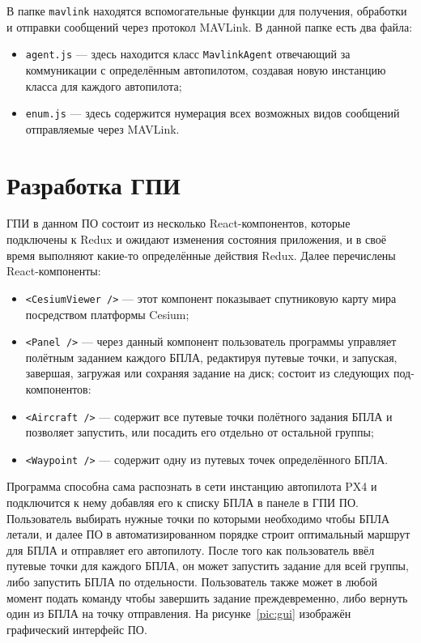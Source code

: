 \documentclass[specification,annotation]{itmo-student-thesis}
\begin{document}
В папке \verb|mavlink| находятся вспомогательные функции для получения,
обработки и отправки сообщений через протокол MAVLink. В данной папке есть два
файла:

\begin{itemize}
  \item \verb|agent.js| --- здесь находится класс \verb|MavlinkAgent| отвечающий
    за коммуникации с определённым автопилотом, создавая новую инстанцию класса
    для каждого автопилота;
  \item \verb|enum.js| --- здесь содержится нумерация всех возможных видов
    сообщений отправляемые через MAVLink.
\end{itemize}

\section{Разработка ГПИ}\label{sec:devgui}

ГПИ в данном ПО состоит из несколько React-компонентов, которые подключены к
Redux и ожидают изменения состояния приложения, и в своё время выполняют
какие-то определённые действия Redux. Далее перечислены React-компоненты:

\begin{itemize}
  \item \verb|<CesiumViewer />| --- этот компонент показывает спутниковую карту
    мира посредством платформы Cesium;
  \item \verb|<Panel />| --- через данный компонент пользователь программы
    управляет полётным заданием каждого БПЛА, редактируя путевые точки, и
    запуская, завершая, загружая или сохраняя задание на диск; состоит из
    следующих под-компонентов:
    \item \verb|<Aircraft />| --- содержит все путевые точки полётного задания
      БПЛА и позволяет запустить, или посадить его отдельно от остальной группы;
    \item \verb|<Waypoint />| --- содержит одну из путевых точек определённого
      БПЛА.
\end{itemize}

Программа способна сама распознать в сети инстанцию автопилота PX4 и
подключится к нему добавляя его к списку БПЛА в панеле в ГПИ ПО. Пользователь
выбирать нужные точки по которыми необходимо чтобы БПЛА летали, и далее ПО
в автоматизированном порядке строит оптимальный маршрут для БПЛА и отправляет
его автопилоту. После того как пользователь ввёл путевые точки для каждого БПЛА,
он может запустить задание для всей группы, либо запустить БПЛА по отдельности.
Пользователь также может в любой момент подать команду чтобы завершить задание
преждевременно, либо вернуть один из БПЛА на точку отправления. На
рисунке~\ref{pic:gui} изображён графический интерфейс ПО.
\end{document}
